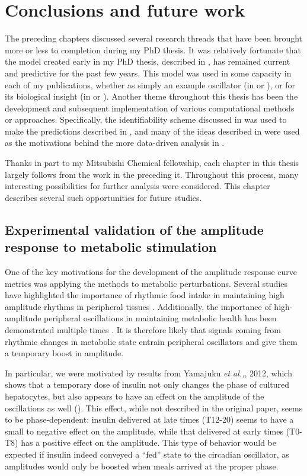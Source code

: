 \chapter{Conclusions and future work}

The preceding chapters discussed several research threads that have been brought more or less to completion during my PhD thesis.
It was relatively fortunate that the model created early in my PhD thesis, described in , has remained current and predictive for the past few years.
This model was used in some capacity in each of my publications, whether as simply an example oscillator (in  or ), or for its biological insight (in  or ).
Another theme throughout this thesis has been the development and subsequent implementation of various computational methods or approaches.
Specifically, the identifiability scheme discussed in  was used to make the predictions described in , and many of the ideas described in  were used as the motivations behind the more data-driven analysis in .

Thanks in part to my Mitsubishi Chemical fellowship, each chapter in this thesis largely follows from the work in the preceding it.
Throughout this process, many interesting possibilities for further analysis were considered.
This chapter describes several such opportunities for future studies.

\section{Experimental validation of the amplitude response to metabolic stimulation}\label{sec:chida}

One of the key motivations for the development of the amplitude response curve metrics was applying the methods to metabolic perturbations.
Several studies have highlighted the importance of rhythmic food intake in maintaining high amplitude rhythms in peripheral tissues \cite{Vollmers2009, Hatori2012}.
Additionally, the importance of high-amplitude peripheral oscillations in maintaining metabolic health has been demonstrated multiple times \cite{Hatori2012, Marcheva2010}.
It is therefore likely that signals coming from rhythmic changes in metabolic state entrain peripheral oscillators and give them a temporary boost in amplitude.

In particular, we were motivated by results from Yamajuku {\itshape et al.,}, 2012, which shows that a temporary dose of insulin not only changes the phase of cultured hepatocytes, but also appears to have an effect on the amplitude of the oscillations as well ().
This effect, while not described in the original paper, seems to be phase-dependent: insulin delivered at late times (T12-20) seems to have a small to negative effect on the amplitude, while that delivered at early times (T0-T8) has a positive effect on the amplitude.
This type of behavior would be expected if insulin indeed conveyed a ``fed'' state to the circadian oscillator, as amplitudes would only be boosted when meals arrived at the proper phase.

